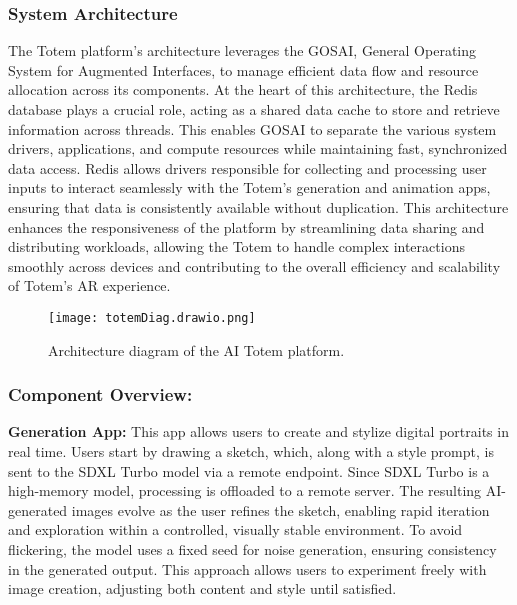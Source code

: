 \subsubsection{System Architecture}

The Totem platform's architecture leverages the GOSAI, General Operating System for Augmented Interfaces, to manage efficient data flow and resource allocation across its components.
At the heart of this architecture, the Redis\cite{carlson2013redis} database plays a crucial role, acting as a shared data cache to store and retrieve information across threads.
This enables GOSAI to separate the various system drivers, applications, and compute resources while maintaining fast, synchronized data access.
Redis allows drivers responsible for collecting and processing user inputs to interact seamlessly with the Totem’s generation and animation apps, ensuring that data is consistently available without duplication.
This architecture enhances the responsiveness of the platform by streamlining data sharing and distributing workloads, allowing the Totem to handle complex interactions smoothly across devices and contributing to the overall efficiency and scalability of Totem’s AR experience.

\begin{figure}[h!]
    \centering
    \texttt{[image: totemDiag.drawio.png]}
    \caption{Architecture diagram of the AI Totem platform.}
    \vspace{0.1cm}
    \label{fig:diagtotem}
\end{figure}

\subsubsection{ Component Overview:}

\textbf{Generation App:} This app allows users to create and stylize digital portraits in real time.
Users start by drawing a sketch, which, along with a style prompt, is sent to the SDXL Turbo model via a remote endpoint.
Since SDXL Turbo is a high-memory model, processing is offloaded to a remote server.
The resulting AI-generated images evolve as the user refines the sketch, enabling rapid iteration and exploration within a controlled, visually stable environment.
To avoid flickering, the model uses a fixed seed for noise generation, ensuring consistency in the generated output.
This approach allows users to experiment freely with image creation, adjusting both content and style until satisfied.

